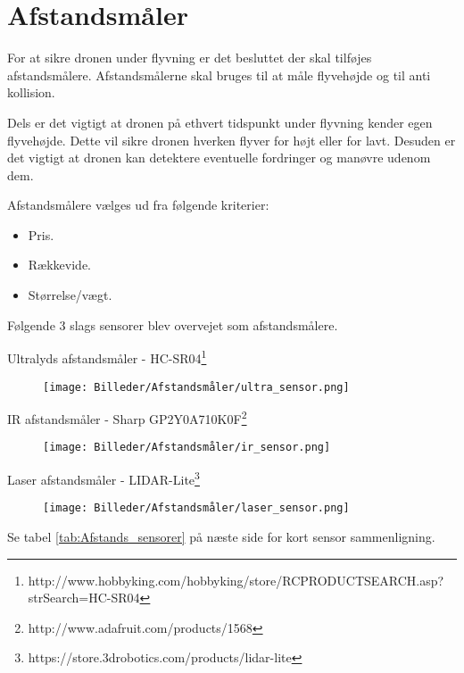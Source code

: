 \section{Afstandsmåler}

For at sikre dronen under flyvning er det besluttet der skal tilføjes afstandsmålere. Afstandsmålerne skal bruges til at måle flyvehøjde og til anti kollision.

Dels er det vigtigt at dronen på ethvert tidspunkt under flyvning kender egen flyvehøjde. Dette vil sikre dronen hverken flyver for højt eller for lavt. Desuden er det vigtigt at dronen kan detektere eventuelle fordringer og manøvre udenom dem.

Afstandsmålere vælges ud fra følgende kriterier:  
\begin{itemize}
	\item Pris.
	\item Rækkevide. 
	\item Størrelse/vægt. 
\end{itemize}

\vspace{0.5cm}

Følgende 3 slags sensorer blev overvejet som afstandsmålere. 

\centering
Ultralyds afstandsmåler - HC-SR04\footnote{http://www.hobbyking.com/hobbyking/store/RC\textunderscore PRODUCT\textunderscore SEARCH.asp?strSearch=HC-SR04}

\begin{figure}[H]
\centering
\texttt{[image: Billeder/Afstandsmåler/ultra\_sensor.png]}
\label{fig:ultra_sensor}
\end{figure}



IR afstandsmåler - Sharp GP2Y0A710K0F\footnote{http://www.adafruit.com/products/1568}
\begin{figure}[H]
\centering
\texttt{[image: Billeder/Afstandsmåler/ir\_sensor.png]}
\label{fig:ir_sensor}
\end{figure}

Laser afstandsmåler - LIDAR-Lite\footnote{https://store.3drobotics.com/products/lidar-lite}
\begin{figure}[H]
\centering
\texttt{[image: Billeder/Afstandsmåler/laser\_sensor.png]}
\label{fig:laser_sensor}
\end{figure}

Se tabel \ref{tab:Afstands_sensorer} på næste side for kort sensor sammenligning.

